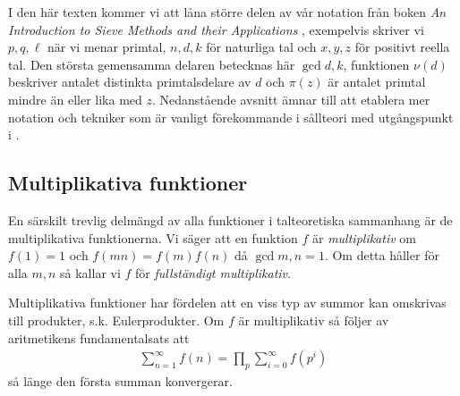 
I den här texten kommer vi att låna större delen av vår notation från boken \textit{An Introduction to Sieve Methods and their Applications} \cite{cojocarumurty}, exempelvis skriver vi \(p, q, \ell\) när vi menar primtal, \(n, d, k\) för naturliga tal och \(x, y, z\) för positivt reella tal. Den största gemensamma delaren betecknas här \(\gcd{d, k}\), funktionen \(\nu(d)\) beskriver antalet distinkta primtalsdelare av \(d\) och \(\pi(z)\) är antalet primtal mindre än eller lika med \(z\). Nedanstående avsnitt ämnar till att etablera mer notation och tekniker som är vanligt förekommande i sållteori med utgångspunkt i \cite{cojocarumurty}.

\subsection{Multiplikativa funktioner} \label{mult}
En särskilt trevlig delmängd av alla funktioner i talteoretiska sammanhang är de multiplikativa funktionerna. Vi säger att en funktion $f$ är \textit{multiplikativ} om $f(1) = 1$ och \(f(mn) = f(m)f(n)\) då $\gcd{m,n} = 1$. Om detta håller för alla $m, n$ så kallar vi $f$ för \textit{fullständigt multiplikativ}. 

Multiplikativa funktioner har fördelen att en viss typ av summor kan omskrivas till produkter, s.k. Eulerprodukter. Om \(f\) är multiplikativ så följer av aritmetikens fundamentalsats att
\begin{align*}
    \sum_{n = 1}^\infty f(n) = \prod_p \sum_{i=0}^\infty f(p^i)
\end{align*}
så länge den första summan konvergerar. 


